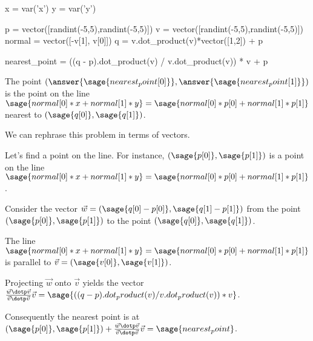 \documentclass{ximera}
\author{Jim Fowler}
\begin{document}
\makerandom

\begin{sagesilent}
  x = var('x')
  y = var('y')
  
  p = vector([randint(-5,5),randint(-5,5)])
  v = vector([randint(-5,5),randint(-5,5)])
  normal = vector([-v[1], v[0]])
  q = v.dot_product(v)*vector([1,2]) + p

  nearest_point = ((q - p).dot_product(v) / v.dot_product(v)) * v + p
\end{sagesilent}

\begin{exercise}
  The point \(\left(\answer{\sage{nearest_point[0]}},\answer{\sage{nearest_point[1]}}\right)\) is the point on the line \(\sage{normal[0]*x + normal[1]*y} = \sage{normal[0]*p[0] + normal[1]*p[1]}\) nearest to \(\left(\sage{q[0]},\sage{q[1]}\right)\).

  \begin{hint}
    We can rephrase this problem in terms of vectors.
  \end{hint}
  
  \begin{hint}
    Let's find a point on the line.  For instance, \(\left(\sage{p[0]},\sage{p[1]}\right)\) is a point on the line \(\sage{normal[0]*x + normal[1]*y} = \sage{normal[0]*p[0] + normal[1]*p[1]}\).
  \end{hint}

  \begin{hint}
    Consider the vector $\vec{w} = \left( \sage{q[0]-p[0]}, \sage{q[1] - p[1]} \right)$ from the point \(\left(\sage{p[0]},\sage{p[1]}\right)\) to the point \(\left(\sage{q[0]},\sage{q[1]}\right)\).
  \end{hint}

  \begin{hint}
    The line \(\sage{normal[0]*x + normal[1]*y} = \sage{normal[0]*p[0] + normal[1]*p[1]}\) is parallel to $\vec{v} = \left( \sage{v[0]}, \sage{v[1]} \right)$.
  \end{hint}

  \begin{hint}
    Projecting $\vec{w}$ onto $\vec{v}$ yields the vector \( \frac{\vec{w} \dotp \vec{v}}{\vec{v} \dotp \vec{v}} \vec{v} = \sage{((q - p).dot_product(v) / v.dot_product(v)) * v}\).
  \end{hint}

  \begin{hint}
    Consequently the nearest point is at \(\left(\sage{p[0]},\sage{p[1]}\right) + \frac{\vec{w} \dotp \vec{v}}{\vec{v} \dotp \vec{v}} \vec{v} = \sage{nearest_point}\).
  \end{hint}
  
\end{exercise}
\end{document}
